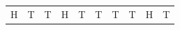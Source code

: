 {{\begin{center}
\begin{xtabular}[t]{|l|l|l|l|l|l|l|l|l|l|}
    
        H &
    
    
        T &
    
    
        T &
    
    
        H &
    
    
        T &
    
    
        T &
    
    
        T &
    
    
        T &
    
    
        H &
    
    
        T%
     \tabularnewline{}
    

\end{xtabular}
\end{center}}}
